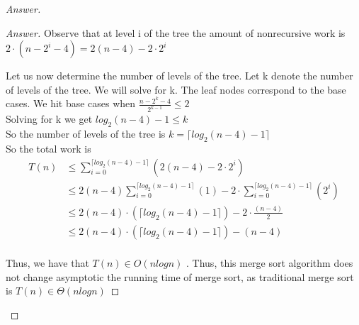 \documentclass[11pt]{article}
\theoremstyle{definition}
\theoremstyle{definition}
\theoremstyle{definition}
\begin{document}
\begin{proof}[Answer]
\begin{proof}[Answer]
Observe that at level i of the tree the amount of nonrecursive work is $2\cdot(n-2^i-4) = 2(n-4)-2\cdot2^i$

Let us now determine the number of levels of the tree. Let k denote the number of levels of the tree. We will solve for k. The leaf nodes correspond to the base cases. 
We hit base cases when $\frac{n-2^k-4}{2^{k-1}} \leq  2$ \\ 
Solving for k we get $log_2(n-4)-1 \leq k$ \\
So the number of levels of the tree is $k = \lceil log_2(n-4)-1 \rceil$ \\

So the total work is \\
\begin{align*}
T(n) &\leq \sum_{i=0}^{\lceil log_2(n-4)-1 \rceil}(2(n-4)-2\cdot2^i)\\
 &\leq 2(n-4) \sum_{i=0}^{\lceil log_2(n-4)-1 \rceil}(1) - 2 \cdot \sum_{i=0}^{\lceil log_2(n-4)-1 \rceil}(2^i) \\
 &\leq 2(n-4)\cdot(\lceil log_2(n-4)-1 \rceil )- 2 \cdot \frac{(n-4)}{2} \\
 &\leq 2(n-4)\cdot(\lceil log_2(n-4)-1 \rceil )- (n-4) \\
\end{align*}

Thus, we have that $T(n) \in O(nlogn)$
.
Thus, this merge sort algorithm does not change asymptotic the running time of merge sort, as traditional merge sort is $T(n) \in \Theta(nlogn)$ 
\end{proof}


\end{proof}




\end{document}
